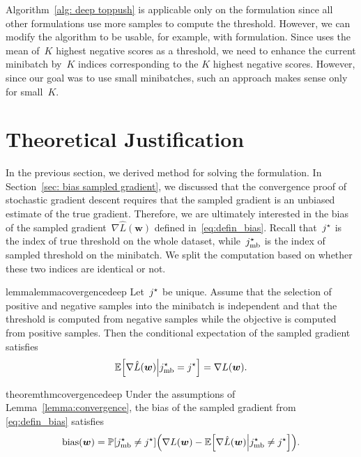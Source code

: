 \begin{note}\label{note: deep extension}
  Algorithm~\ref{alg: deep toppush} is applicable only on the \TopPush formulation since all other formulations use more samples to compute the threshold. However, we can modify the algorithm to be usable, for example, with \TopPushK formulation. Since \TopPushK uses the mean of~$K$ highest negative scores as a threshold, we need to enhance the current minibatch by~$K$ indices corresponding to the $K$ highest negative scores. However, since our goal was to use small minibatches, such an approach makes sense only for small~$K.$ 
\end{note}

\section{Theoretical Justification}

In the previous section, we derived \DeepTopPush method for solving the \TopPush formulation. In Section~\ref{sec: bias sampled gradient}, we discussed that the convergence proof of stochastic gradient descent requires that the sampled gradient is an unbiased estimate of the true gradient. Therefore, we are ultimately interested in the bias of the sampled gradient~$\nabla \hat{L}(\bm{w})$ defined in~\eqref{eq:defin_bias}. Recall that~$j^{\star}$ is the index of true threshold on the whole dataset, while~$j^{\star}_{\text{mb}}$ is the index of sampled threshold on the minibatch. We split the computation based on whether these two indices are identical or not.

\begin{restatable}{lemma}{lemmacovergencedeep}\label{lemma:convergence}
  Let~$j^{\star}$ be unique. Assume that the selection of positive and negative samples into the minibatch is independent and that the threshold is computed from negative samples while the objective is computed from positive samples. Then the conditional expectation of the sampled gradient satisfies
  \begin{equation*}
    \EE\Brac[s]{\nabla \hat{L}(\bm{w}) \middle\vert\indmaxmb=\indmax} =  \nabla L(\bm{w}).
  \end{equation*}
\end{restatable}

\begin{restatable}{theorem}{thmcovergencedeep}\label{theorem:convergence}
  Under the assumptions of Lemma~\ref{lemma:convergence}, the bias of the sampled gradient from \eqref{eq:defin_bias} satisfies
  \begin{equation}\label{eq:comp_bias}
    \bias(\bm{w}) = \PP\Brac[s]{\indmaxmb\neq \indmax} \Brac{\nabla L(\bm{w}) - \EE\Brac[s]{\nabla \hat{L}(\bm{w}) \middle\vert \indmaxmb\neq \indmax}}.
  \end{equation}
\end{restatable}

